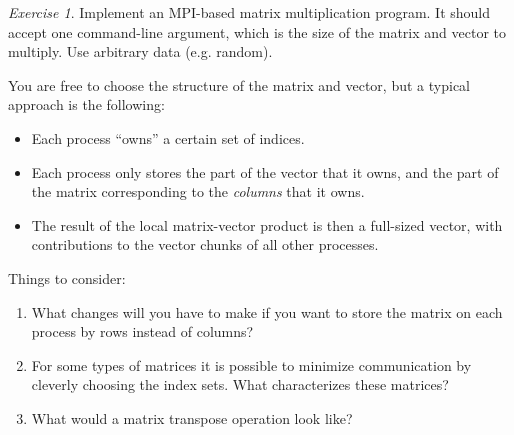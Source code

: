 \documentclass[onecolumn, oneside, a4paper, 11pt]{memoir}
\theoremstyle{remark}
\newtheorem{ex}{Exercise}
\begin{document}
\begin{ex}
  Implement an MPI-based matrix multiplication program. It should accept one
  command-line argument, which is the size of the matrix and vector to multiply.
  Use arbitrary data (e.g. random).

  You are free to choose the structure of the matrix and vector, but a typical
  approach is the following:
  \begin{itemize}
  \item Each process ``owns'' a certain set of indices.
  \item Each process only stores the part of the vector that it owns, and the
    part of the matrix corresponding to the \emph{columns} that it owns.
  \item The result of the local matrix-vector product is then a full-sized
    vector, with contributions to the vector chunks of all other processes.
  \end{itemize}

  Things to consider:
  \begin{enumerate}
  \item What changes will you have to make if you want to store the matrix on each
    process by rows instead of columns?
  \item For some types of matrices it is possible to minimize communication by
    cleverly choosing the index sets. What characterizes these matrices?
  \item What would a matrix transpose operation look like?
  \end{enumerate}
\end{ex}
\end{document}
